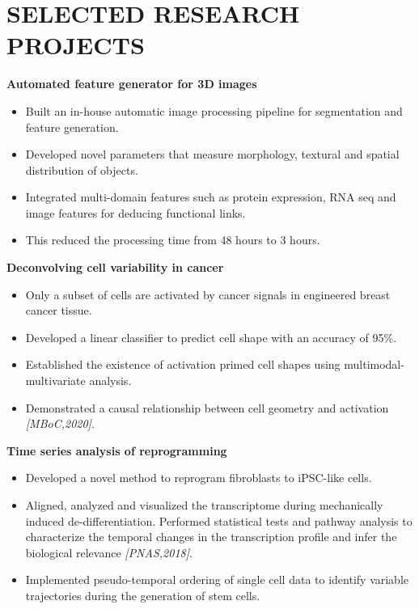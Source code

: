 \documentclass[letterpaper,11pt]{article}
\begin{document}
\section{\bf SELECTED RESEARCH PROJECTS}
{\bf Automated feature generator for 3D images}
\begin{itemize}
    \item Built an in-house automatic image processing pipeline for segmentation and feature generation.
    \item Developed novel parameters that measure morphology, textural and spatial distribution of objects.
     \item Integrated multi-domain features such as protein expression, RNA seq and image features for deducing functional links. 
    \item This reduced the processing time from 48 hours to 3 hours. 
\end{itemize}
\vspace{1mm}
{\bf Deconvolving cell variability in cancer}
\begin{itemize}
    \item Only a subset of cells are activated by cancer signals in engineered breast cancer tissue.
     \item Developed a linear classifier to predict cell shape with an accuracy of 95\%.
     \item Established the existence of activation primed cell shapes using multimodal-multivariate analysis.
    \item Demonstrated a causal relationship between cell geometry and activation \emph {[MBoC,2020]}.
\end{itemize}
\vspace{1mm}
{\bf Time series analysis of reprogramming}
\begin{itemize}
    \item Developed a novel method to reprogram fibroblasts to iPSC-like cells.
    \item Aligned, analyzed and visualized the transcriptome during mechanically induced de-differentiation. Performed statistical tests and pathway analysis to characterize the temporal changes in the transcription profile and infer the biological relevance \emph {[PNAS,2018]}.
    \item Implemented pseudo-temporal ordering of single cell data to identify variable trajectories during the generation of stem cells. 
\end{itemize}
\vspace{1mm}
\end{document}

